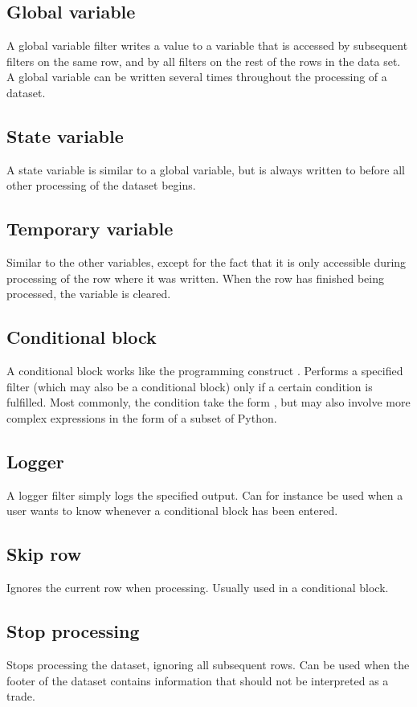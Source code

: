 \subsection{Global variable}
A global variable filter writes a value to a variable that is accessed by subsequent filters on the same row, and by all filters on the rest of the rows in the data
set. A global variable can be written several times throughout the processing of a dataset.

\subsection{State variable}
A state variable is similar to a global variable, but is always written to before all other processing of the dataset begins.

\subsection{Temporary variable}
Similar to the other variables, except for the fact that it is only accessible during processing of the row where it was written. When the row has finished being
processed, the variable is cleared.

\subsection{Conditional block}
A conditional block works like the programming construct . Performs a specified filter (which may also be a conditional block) only if a certain
condition is fulfilled. Most commonly, the condition take the form , but may also involve more complex expressions in the form of a
subset of Python.

\subsection{Logger}
A logger filter simply logs the specified output. Can for instance be used when a user wants to know whenever a conditional block has been entered.

\subsection{Skip row}
Ignores the current row when processing. Usually used in a conditional block.

\subsection{Stop processing}
Stops processing the dataset, ignoring all subsequent rows. Can be used when the footer of the dataset contains information that should not be interpreted
as a trade.


